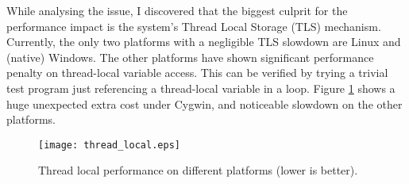 While analysing the issue, I discovered that the biggest culprit for the performance impact
is the system's Thread Local Storage (TLS) mechanism. Currently, the only two platforms
with a negligible TLS slowdown are Linux and (native) Windows. The other platforms
have shown significant performance penalty on thread-local variable access.
This can be verified by trying a trivial test
program just referencing a thread-local variable in a loop. Figure \ref{fig:threadlocal}
shows a huge unexpected extra cost under Cygwin, and noticeable slowdown on the other platforms.

\begin{figure}[H]
\centering
\texttt{[image: thread\_local.eps]}
\caption{Thread local performance on different platforms (lower is better).}
\label{fig:threadlocal}
\end{figure}